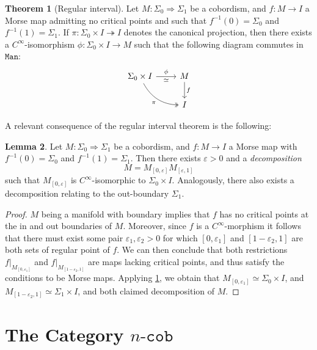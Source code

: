 \documentclass[11pt, reqno]{amsart}
\theoremstyle{definition}
\newtheorem{theorem}{Theorem}[section]
\newtheorem{lemma}[theorem]{Lemma}
\newcommand{\epi}{\twoheadrightarrow}
\newcommand{\iso}{\simeq}
\newcommand{\dis}{\iso}
\newcommand{\nat}{\Rightarrow}
\newcommand{\catfont}{\texttt}
\newcommand{\Cob}[1]{{#1}\text{-}{\catfont{cob}}} %
\newcommand{\Man}{{\catfont{Man}}} %
\begin{document}
\begin{theorem}[Regular interval]\label{thm:regular-interval}
Let \(M: \Sigma_0 \nat \Sigma_1\) be a cobordism, and \(f: M \to I\) a Morse map
admitting no critical points and such that \(f^{-1}(0) = \Sigma_0\) and
\(f^{-1}(1) = \Sigma_1\). If \(\pi: \Sigma_0 \times I \epi I\) denotes the
canonical projection, then there exists a \(C^{\infty}\)-isomorphism
\(\phi: \Sigma_0 \times I \to M\) such that the following diagram commutes in
\(\Man\):
\[
\begin{tikzcd}
\Sigma_0 \times I \ar[r, "\phi", "\dis"'] \ar[rd, two heads, bend right, "\pi"']
&M \ar[d, "f"] \\
&I
\end{tikzcd}
\]
\end{theorem}

A relevant consequence of the regular interval theorem is the following:

\begin{lemma}\label{lem:regular-interval-decomposition-of-cobordism}
Let \(M: \Sigma_0 \nat \Sigma_1\) be a cobordism, and \(f: M \to I\) a Morse map
with \(f^{-1}(0) = \Sigma_0\) and \(f^{-1}(1) = \Sigma_1\). Then there exists
\(\varepsilon > 0\) and a \emph{decomposition}
\[
M = M_{[0, \varepsilon]} M_{[\varepsilon, 1]}
\]
such that \(M_{[0, \varepsilon]}\) is \(C^{\infty}\)-isomorphic to
\(\Sigma_0 \times I\). Analogously, there also exists a decomposition relating
to the out-boundary \(\Sigma_1\).
\end{lemma}

\begin{proof}
\(M\) being a manifold with boundary implies that \(f\) has no critical points
at the in and out boundaries of \(M\). Moreover, since \(f\) is a
\(C^{\infty}\)-morphism it follows that there must exist some pair
\(\varepsilon_1, \varepsilon_2 > 0\) for which \([0, \varepsilon_1]\) and
\([1 - \varepsilon_2, 1]\) are both sets of regular point of \(f\). We can then
conclude that both restrictions \(f|_{M_{[0, \varepsilon_1]}}\) and
\(f|_{M_{[1-\varepsilon_2, 1]}}\) are maps lacking critical points, and thus
satisfy the conditions to be Morse maps. Applying \cref{thm:regular-interval},
we obtain that \(M_{[0, \varepsilon_1]} \iso \Sigma_0 \times I\), and
\(M_{[1 - \varepsilon_2, 1]} \iso \Sigma_1 \times I\), and both claimed
decomposition of \(M\).
\end{proof}

\section{The Category \texorpdfstring{\(\Cob{n}\)}{n-cob}}
\end{document}
